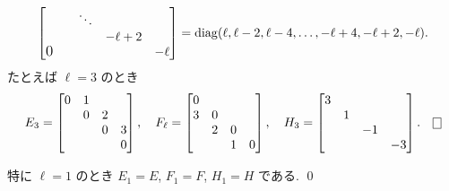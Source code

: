\documentclass[12pt,twoside]{jarticle}
\begin{document}
\begin{question}[15点]
\begin{enumerate}
\begin{align*}
\begin{bmatrix}
             &        & \ddots & & \\
             &        &        & -\ell+2 & \\
        \smash{\hbox{\large 0}}  &  &        &         & -\ell \\
      \end{bmatrix}
      = \mathop{\mathrm{diag}}\nolimits(\ell,\ell-2,\ell-4,\ldots,-\ell+4,-\ell+2,-\ell).
    \end{align*}
    たとえば $\ell=3$ のとき
    \begin{equation*}
      E_3 =
      \begin{bmatrix}
        0 & 1 &   &   \\
          & 0 & 2 &   \\
          &   & 0 & 3 \\
          &   &   & 0 \\
      \end{bmatrix},
      \quad
      F_\ell =
      \begin{bmatrix}
        0 & & & \\
        3 & 0 & & \\
          & 2 & 0 & \\
          &   & 1 & 0 \\
      \end{bmatrix},
      \quad
      H_3 =
      \begin{bmatrix}
        3 & & & \\
          & 1 & & \\
          &   & -1 & \\
          &   &    & -3 \\
      \end{bmatrix}.
      \qed
    \end{equation*}
  \end{enumerate}
\end{question}

\begin{rem}
  特に $\ell=1$ のとき $E_1=E$, $F_1=F$, $H_1=H$ である.  \qed
\end{rem}
\end{document}
